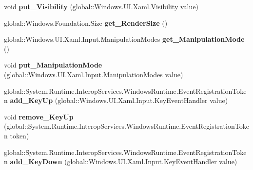 \begin{DoxyCompactItemize}
void {\bfseries put\+\_\+\+Visibility} (global\+::\+Windows.\+U\+I.\+Xaml.\+Visibility value)
\item 
\mbox{\label{interface_windows_1_1_u_i_1_1_xaml_1_1_i_u_i_element_a436b4b809e5f92e434326f446a1b3fb0}} 
global\+::\+Windows.\+Foundation.\+Size {\bfseries get\+\_\+\+Render\+Size} ()
\item 
\mbox{\label{interface_windows_1_1_u_i_1_1_xaml_1_1_i_u_i_element_ac7efa9d3bcb66e3a95621d9e942b339d}} 
global\+::\+Windows.\+U\+I.\+Xaml.\+Input.\+Manipulation\+Modes {\bfseries get\+\_\+\+Manipulation\+Mode} ()
\item 
\mbox{\label{interface_windows_1_1_u_i_1_1_xaml_1_1_i_u_i_element_ae026809f65653a37cd75df9589dc5e90}} 
void {\bfseries put\+\_\+\+Manipulation\+Mode} (global\+::\+Windows.\+U\+I.\+Xaml.\+Input.\+Manipulation\+Modes value)
\item 
\mbox{\label{interface_windows_1_1_u_i_1_1_xaml_1_1_i_u_i_element_abae2e6510442e3bf03b0abd24270a3e7}} 
global\+::\+System.\+Runtime.\+Interop\+Services.\+Windows\+Runtime.\+Event\+Registration\+Token {\bfseries add\+\_\+\+Key\+Up} (global\+::\+Windows.\+U\+I.\+Xaml.\+Input.\+Key\+Event\+Handler value)
\item 
\mbox{\label{interface_windows_1_1_u_i_1_1_xaml_1_1_i_u_i_element_a5d62f2ed59084c31013a2397faab0314}} 
void {\bfseries remove\+\_\+\+Key\+Up} (global\+::\+System.\+Runtime.\+Interop\+Services.\+Windows\+Runtime.\+Event\+Registration\+Token token)
\item 
\mbox{\label{interface_windows_1_1_u_i_1_1_xaml_1_1_i_u_i_element_a06c59188c0e071badb5405f835fbedd1}} 
global\+::\+System.\+Runtime.\+Interop\+Services.\+Windows\+Runtime.\+Event\+Registration\+Token {\bfseries add\+\_\+\+Key\+Down} (global\+::\+Windows.\+U\+I.\+Xaml.\+Input.\+Key\+Event\+Handler value)
\item 
\mbox{\label{interface_windows_1_1_u_i_1_1_xaml_1_1_i_u_i_element_ae7fc7bcada32e7e554fd3685ee2e4022}} 

\end{DoxyCompactItemize}
